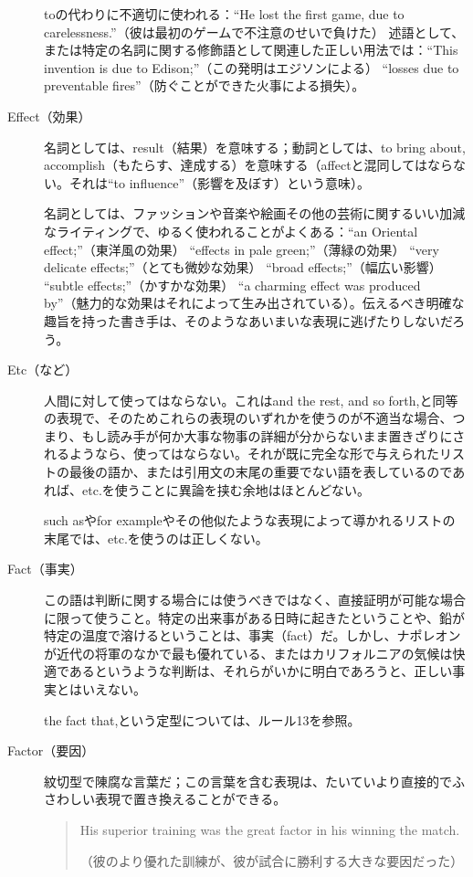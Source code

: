 \begin{description}
toの代わりに不適切に使われる：``He lost the first game, due to
carelessness.''（彼は最初のゲームで不注意のせいで負けた）
述語として、または特定の名詞に関する修飾語として関連した正しい用法では：``This
invention is due to Edison;''（この発明はエジソンによる） ``losses due
to preventable fires''（防ぐことができた火事による損失）。
\item [Effect（効果）]
名詞としては、result（結果）を意味する；動詞としては、to bring
about,
accomplish（もたらす、達成する）を意味する（affectと混同してはならない。それは``to
influence''（影響を及ぼす）という意味）。
\par 
名詞としては、ファッションや音楽や絵画その他の芸術に関するいい加減なライティングで、ゆるく使われることがよくある：``an
Oriental effect;''（東洋風の効果） ``effects in pale
green;''（薄緑の効果） ``very delicate effects;''（とても微妙な効果）
``broad effects;''（幅広い影響） ``subtle effects;''（かすかな効果） ``a
charming effect was produced
by''（魅力的な効果はそれによって生み出されている）。伝えるべき明確な趣旨を持った書き手は、そのようなあいまいな表現に逃げたりしないだろう。
\item [Etc（など）]人間に対して使ってはならない。これはand the rest, and so
forth,と同等の表現で、そのためこれらの表現のいずれかを使うのが不適当な場合、つまり、もし読み手が何か大事な物事の詳細が分からないまま置きざりにされるようなら、使ってはならない。それが既に完全な形で与えられたリストの最後の語か、または引用文の末尾の重要でない語を表しているのであれば、etc.を使うことに異論を挟む余地はほとんどない。
\par
such asやfor
exampleやその他似たような表現によって導かれるリストの末尾では、etc.を使うのは正しくない。
\item [Fact（事実）]この語は判断に関する場合には使うべきではなく、直接証明が可能な場合に限って使うこと。特定の出来事がある日時に起きたということや、鉛が特定の温度で溶けるということは、事実（fact）だ。しかし、ナポレオンが近代の将軍のなかで最も優れている、またはカリフォルニアの気候は快適であるというような判断は、それらがいかに明白であろうと、正しい事実とはいえない。
\par the fact that,という定型については、ルール13を参照。
\item[Factor（要因）]
紋切型で陳腐な言葉だ；この言葉を含む表現は、たいていより直接的でふさわしい表現で置き換えることができる。
\begin{quote}
    His superior training was the great factor in his winning the
match.

（彼のより優れた訓練が、彼が試合に勝利する大きな要因だった）


\end{quote}
\end{description}
